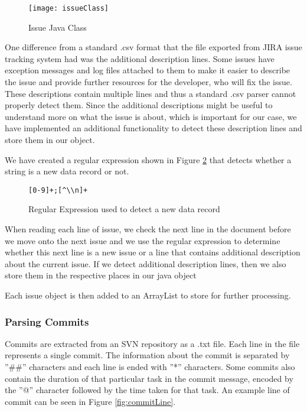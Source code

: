 \begin{figure}
\centering
\texttt{[image: issueClass]}
\caption{Issue Java Class}
\label{fig:issue}
\end{figure}

One difference from a standard .csv format that the file exported from JIRA issue tracking system had was the additional description lines. Some issues have exception messages and log files attached to them to make it easier to describe the issue and provide further resources for the developer, who will fix the issue. These descriptions contain multiple lines and thus a standard .csv parser cannot properly detect them. Since the additional descriptions might be useful to understand more on what the issue is about, which is important for our case, we have implemented an additional functionality to detect these description lines and store them in our object.

We have created a regular expression shown in Figure \ref{fig:regexp} that detects whether a string is a new data record or not.

\begin{figure}
\centering
\verb/[0-9]+;[^\\n]+/
\caption{Regular Expression used to detect a new data record}
\label{fig:regexp}
\end{figure}

When reading each line of issue, we check the next line in the document before we move onto the next issue and we use the regular expression to determine whether this next line is a new issue or a line that contains additional description about the current issue. If we detect additional description lines, then we also store them in the respective places in our java object

Each issue object is then added to an ArrayList to store for further processing.

\subsubsection{Parsing Commits}

Commits are extracted from an SVN repository as a .txt file. Each line in the file represents a single commit. The information about the commit is separated by ''\#\#'' characters and each line is ended with ''\**'' characters. Some commits also contain the duration of that particular task in the commit message, encoded by the ''@'' character followed by the time taken for that task. An example line of commit can be seen in Figure \ref{fig:commitLine}.

